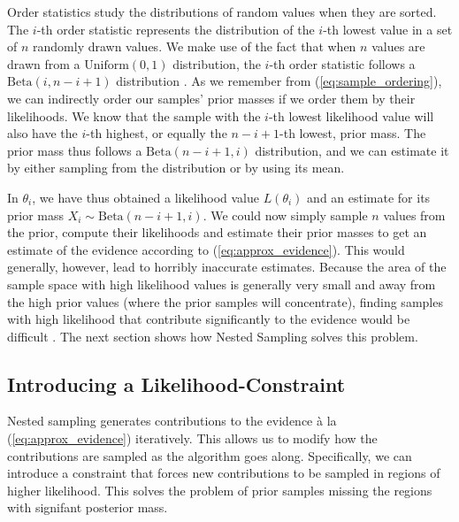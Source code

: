 \documentclass[12pt, a4paper]{report}
\begin{document}
Order statistics study the distributions of random values when they are sorted.
The $i$-th order statistic represents the distribution of the $i$-th lowest value in a set of $n$ randomly drawn values.
We make use of the fact that when $n$ values are drawn from a $\textrm{Uniform}(0,1)$ distribution, the $i$-th order statistic follows a $\textrm{Beta}(i, n-i+1)$ distribution \cite[63]{computational_stats}.
As we remember from (\ref{eq:sample_ordering}), we can indirectly order our samples' prior masses if we order them by their likelihoods.
We know that the sample with the $i$-th lowest likelihood value will also have the $i$-th highest, or equally the $n-i+1$-th lowest, prior mass.
The prior mass thus follows a $\textrm{Beta}(n-i+1, i)$ distribution, and we can estimate it by either sampling from the distribution or by using its mean.

In $\theta_{i}$, we have thus obtained a likelihood value $L(\theta_{i})$ and an estimate for its prior mass $X_{i} \sim  \textrm{Beta}(n-i+1, i)$.
We could now simply sample $n$ values from the prior, compute their likelihoods and estimate their prior masses to get an estimate of the evidence according to (\ref{eq:approx_evidence}).
This would generally, however, lead to horribly inaccurate estimates.
Because the area of the sample space with high likelihood values is generally very small and away from the high prior values (where the prior samples will concentrate), finding samples with high likelihood that contribute significantly to the evidence would be difficult \cite[7]{skilling}.
The next section shows how Nested Sampling solves this problem.

\subsection{Introducing a Likelihood-Constraint} 
Nested sampling generates contributions to the evidence à la (\ref{eq:approx_evidence}) iteratively.
This allows us to modify how the contributions are sampled as the algorithm goes along.
Specifically, we can introduce a constraint that forces new contributions to be sampled in regions of higher likelihood.
This solves the problem of prior samples missing the regions with signifant posterior mass.
\end{document}
